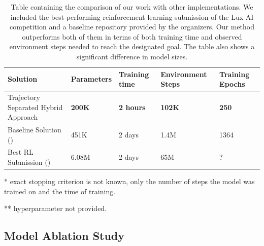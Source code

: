 \bigskip


\begin{table}[htbp]
    \footnotesize
    \renewcommand{\arraystretch}{1.2}%
    \begin{threeparttable}
        \begin{tabularx}{\linewidth}{|X|C{2.0cm}|C{2.0cm}|C{2.0cm}|C{2.0cm}|}
            \hline
            \textbf{Solution} & \textbf{Parameters}  & \textbf{Training time} & \textbf{Environment Steps} & \textbf{Training Epochs} \\
            \hline
            Trajectory Separated Hybrid Approach & \textbf{200K} & \textbf{2 hours} & \textbf{102K} & \textbf{250} \\
            Baseline Solution (\cite{luxai_s2-baseline-source}) & 451K & 2 days & 1.4M & 1364 \\
            Best RL Submission (\cite{ferdinand}) & 6.08M & 2 days\tnote{*} & 65M\tnote{*} & ?\tnote{**} \\
            \hline
        \end{tabularx}
        \begin{tablenotes}
            \item[*] exact stopping criterion is not known, only the number of steps the model was trained on and the time of training.
            \item[**]  hyperparameter not provided.
        \end{tablenotes}
        \captionsetup{justification=justified, singlelinecheck=false, width=1\linewidth, labelfont=bf} 
        \caption{Table containing the comparison of our work with other implementations. We included the best-performing reinforcement learning submission of the Lux AI competition and a baseline repository provided by the organizers. Our method outperforms both of them in terms of both training time and observed environment steps needed to reach the designated goal. The table also shows a significant difference in model sizes.}
        \label{tab:other-work-comparisons}
    \end{threeparttable}
\end{table}


\subsection{Model Ablation Study}
\label{subsec:ablation}

